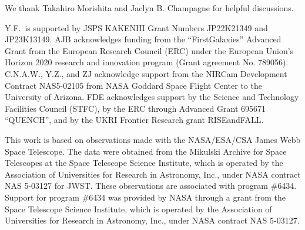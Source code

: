 \documentclass[twocolumn]{aastex631}
\begin{document}
\begin{acknowledgments}
We thank Takahiro Morishita and Jaclyn B. Champagne for helpful discussions.


Y.F.\ is supported by JSPS KAKENHI Grant Numbers JP22K21349 and JP23K13149. AJB acknowledges funding from the ``FirstGalaxies'' Advanced Grant from the European Research Council (ERC) under the European Union's Horizon 2020 research and innovation program (Grant agreement No. 789056). C.N.A.W., Y.Z., and ZJ acknowledge support from the NIRCam Development Contract NAS5-02105 from NASA Goddard Space Flight Center to the University of Arizona. FDE acknowledges support by the Science and Technology Facilities Council (STFC), by the ERC through Advanced Grant 695671 ``QUENCH'', and by the UKRI Frontier Research grant RISEandFALL.

This work is based on observations made with the NASA/ESA/CSA James Webb Space Telescope. The data were obtained from the Mikulski Archive for Space Telescopes at the Space Telescope Science Institute, which is operated by the Association of Universities for Research in Astronomy, Inc., under NASA contract NAS 5-03127 for JWST. These observations are associated with program \#6434.
Support for program \#6434 was provided by NASA through a grant from the Space Telescope Science Institute, which is operated by the Association of Universities for Research in Astronomy, Inc., under NASA contract NAS 5-03127. 

\end{acknowledgments}

%
\end{document}
